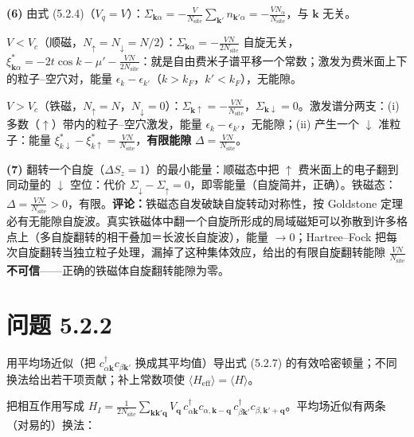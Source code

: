 \textbf{(6)} 由式 (5.2.4)（$V_q=V$）：$\Sigma_{\pmb{k}\alpha}=-\frac{V}{N_{\mathrm{site}}}\sum_{\pmb{k}'}n_{\pmb{k}'\alpha}=-\frac{VN_{\alpha}}{N_{\mathrm{site}}}$，与 $\pmb{k}$ 无关。

$V<V_c$（顺磁，$N_\uparrow=N_\downarrow=N/2$）：$\Sigma_{\pmb{k}\alpha}=-\frac{VN}{2N_{\mathrm{site}}}$ 自旋无关，$\xi^{*}_{\pmb{k}\alpha}=-2t\cos k-\mu'-\frac{VN}{2N_{\mathrm{site}}}$：就是自由费米子谱平移一个常数；激发为费米面上下的粒子--空穴对，能量 $\epsilon_k-\epsilon_{k'}$（$k>k_F$，$k'<k_F$），无能隙。

$V>V_c$（铁磁，$N_\uparrow=N$，$N_\downarrow=0$）：$\Sigma_{\pmb{k}\uparrow}=-\frac{VN}{N_{\mathrm{site}}}$，$\Sigma_{\pmb{k}\downarrow}=0$。激发谱分两支：(i) 多数（$\uparrow$）带内的粒子--空穴激发，能量 $\epsilon_k-\epsilon_{k'}$，无能隙；(ii) 产生一个 $\downarrow$ 准粒子：能量 $\xi^{*}_{k\downarrow}-\xi^{*}_{k\uparrow}=\frac{VN}{N_{\mathrm{site}}}$，\textbf{有限能隙} $\Delta=\frac{VN}{N_{\mathrm{site}}}$。

\textbf{(7)} 翻转一个自旋（$\Delta S_z=1$）的最小能量：顺磁态中把 $\uparrow$ 费米面上的电子翻到同动量的 $\downarrow$ 空位：代价 $\Sigma_\downarrow-\Sigma_\uparrow=0$，即零能量（自旋简并，正确）。铁磁态：$\Delta=\frac{VN}{N_{\mathrm{site}}}>0$，有限。\textbf{评论：}铁磁态自发破缺自旋转动对称性，按 Goldstone 定理必有无能隙自旋波。真实铁磁体中翻一个自旋所形成的局域磁矩可以弥散到许多格点上（多自旋翻转的相干叠加＝长波长自旋波），能量 $\to0$；Hartree--Fock 把每次自旋翻转当独立粒子处理，漏掉了这种集体效应，给出的有限自旋翻转能隙 $\frac{VN}{N_{\mathrm{site}}}$ \textbf{不可信}——正确的铁磁体自旋翻转能隙为零。

\section*{问题 5.2.2}
\begin{problem}
用平均场近似（把 $c^{\dagger}_{\alpha\pmb{k}}c_{\beta\pmb{k}'}$ 换成其平均值）导出式 (5.2.7) 的有效哈密顿量；不同换法给出若干项贡献；补上常数项使 $\langle H_{\mathrm{eff}}\rangle=\langle H\rangle$。
\end{problem}
\solution

把相互作用写成 $H_I=\frac{1}{2N_{\mathrm{site}}}\sum_{\pmb{k}\pmb{k}'\pmb{q}}V_{\pmb{q}}\,c^{\dagger}_{\alpha\pmb{k}}c_{\alpha,\pmb{k}-\pmb{q}}\,c^{\dagger}_{\beta\pmb{k}'}c_{\beta,\pmb{k}'+\pmb{q}}$。平均场近似有两条（对易的）换法：

